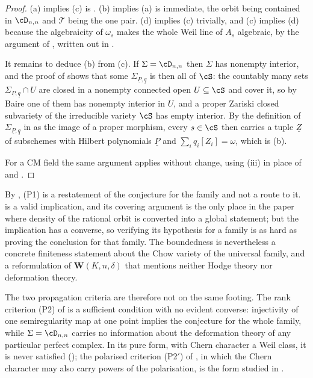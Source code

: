 \begin{proof}
(a) implies (c) is . (b) implies (a) is immediate, the
orbit being contained in $\cD_{n,n}$ and $\mathcal{T}$ being the one pair.
(d) implies (c) trivially, and (c) implies (d) because the algebraicity of
$\omega_{s}$ makes the whole Weil line of $A_{s}$ algebraic, by the argument
of , written out in .

It remains to deduce (b) from (c). If $\Sigma=\cD_{n,n}$ then $\Sigma$ has
nonempty interior, and the proof of  shows that some
$\Sigma_{\underline{P},\underline{q}}$ is then all of $\cS$: the countably
many sets $\Sigma_{\underline{P},\underline{q}}\cap U$ are closed in a
nonempty connected open $U\subseteq\cS$ and cover it, so by Baire one of them
has nonempty interior in $U$, and a proper Zariski closed subvariety of the
irreducible variety $\cS$ has empty interior. By the definition of
$\Sigma_{\underline{P},\underline{q}}$ in  as the image of a proper morphism, every $s\in\cS$
then carries a tuple $\underline{Z}$ of subschemes with Hilbert polynomials
$\underline{P}$ and $\sum_{i}q_{i}[Z_{i}]=\omega$, which is (b).

For a CM field the same argument applies without change, using
(iii) in place of  and
.
\end{proof}

\begin{remark}\label{rem:p1collapse}
By , \textup{(P1)} is a restatement of the conjecture
for the family and not a route to it.  is a valid
implication, and its covering argument is the only place in the paper where
density of the rational orbit is converted into a global statement; but the
implication has a converse, so verifying its hypothesis for a family is as
hard as proving the conclusion for that family. The boundedness is
nevertheless a concrete finiteness statement about the Chow variety of the
universal family, and a reformulation of $\mathbf{W}(K,n,\delta)$ that
mentions neither Hodge theory nor deformation theory.

The two propagation criteria are therefore not on the same footing. The rank
criterion \textup{(P2)} of \cite[Theorem~2.3]{paperII} is a sufficient
condition with no evident converse: injectivity of one semiregularity map at
one point implies the conjecture for the whole family, while
$\Sigma=\cD_{n,n}$ carries no information about the deformation theory of any
particular perfect complex. In its pure form, with Chern character a Weil
class, it is never satisfied (\cite[Theorem~3.5]{paperII}); the polarised criterion
\textup{(P2$'$)} of \cite[Remark~3.6]{paperII}, in which the Chern character may also
carry powers of the polarisation, is the form studied in
\cite[Section~3]{paperII}.
\end{remark}

